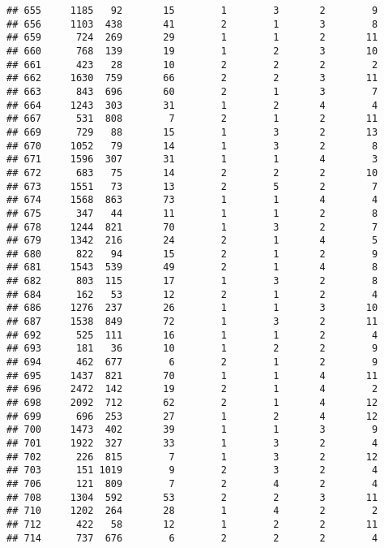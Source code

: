 \documentclass[]{article}
\begin{document}
\begin{verbatim}
## 655     1185   92       15        1        3       2        9
## 656     1103  438       41        2        1       3        8
## 659      724  269       29        1        1       2       11
## 660      768  139       19        1        2       3       10
## 661      423   28       10        2        2       2        2
## 662     1630  759       66        2        2       3       11
## 663      843  696       60        2        1       3        7
## 664     1243  303       31        1        2       4        4
## 667      531  808        7        2        1       2       11
## 669      729   88       15        1        3       2       13
## 670     1052   79       14        1        3       2        8
## 671     1596  307       31        1        1       4        3
## 672      683   75       14        2        2       2       10
## 673     1551   73       13        2        5       2        7
## 674     1568  863       73        1        1       4        4
## 675      347   44       11        1        1       2        8
## 678     1244  821       70        1        3       2        7
## 679     1342  216       24        2        1       4        5
## 680      822   94       15        2        1       2        9
## 681     1543  539       49        2        1       4        8
## 682      803  115       17        1        3       2        8
## 684      162   53       12        2        1       2        4
## 686     1276  237       26        1        1       3       10
## 687     1538  849       72        1        3       2       11
## 692      525  111       16        1        1       2        4
## 693      181   36       10        1        2       2        9
## 694      462  677        6        2        1       2        9
## 695     1437  821       70        1        1       4       11
## 696     2472  142       19        2        1       4        2
## 698     2092  712       62        2        1       4       12
## 699      696  253       27        1        2       4       12
## 700     1473  402       39        1        1       3        9
## 701     1922  327       33        1        3       2        4
## 702      226  815        7        1        3       2       12
## 703      151 1019        9        2        3       2        4
## 706      121  809        7        2        4       2        4
## 708     1304  592       53        2        2       3       11
## 710     1202  264       28        1        4       2        2
## 712      422   58       12        1        2       2       11
## 714      737  676        6        2        2       2        4

\end{verbatim}
\end{document}
